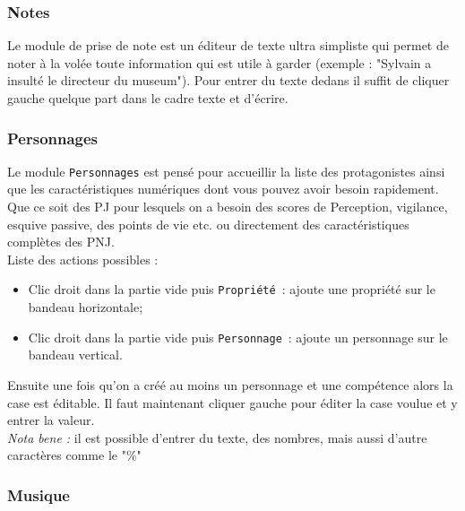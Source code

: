 \documentclass[a4paper,12pt]{article}
\newcommand*{\interfaceitem}[1]{\texttt{#1}}
\begin{document}
\subsubsection{Notes}
\label{sec:notes}

Le module de prise de note est un éditeur de texte ultra simpliste qui permet de noter à la volée toute information qui est utile à garder (exemple : "Sylvain a insulté le directeur du museum"). Pour entrer du texte dedans il suffit de cliquer gauche quelque part dans le cadre texte et d'écrire.
\\

\subsubsection{Personnages}
\label{sec:perso}

Le module \interfaceitem{Personnages} est pensé pour accueillir la liste des protagonistes ainsi que les caractéristiques numériques dont vous pouvez avoir besoin rapidement. Que ce soit des PJ pour lesquels on a besoin des scores de Perception, vigilance, esquive passive, des points de vie etc. ou directement des caractéristiques complètes des PNJ.
\\
Liste des actions possibles :
\begin{itemize}
    \item Clic droit dans la partie vide puis \interfaceitem{Propriété}~: ajoute une propriété sur le bandeau horizontale;
    \item Clic droit dans la partie vide puis \interfaceitem{Personnage}~: ajoute un personnage sur le bandeau vertical.
\end{itemize}
Ensuite une fois qu'on a créé au moins un personnage et une compétence alors la case est éditable. Il faut maintenant cliquer gauche pour éditer la case voulue et y entrer la valeur.
\\\emph{Nota bene :} il est possible d'entrer du texte, des nombres, mais aussi d'autre caractères comme le "\%"

\subsubsection{Musique}
\label{sec:musique}
\end{document}

